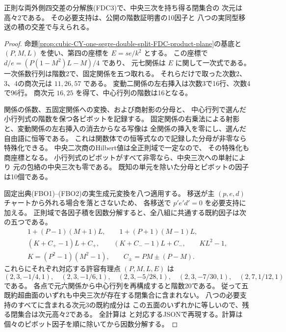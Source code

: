\begin{theorem}\label{thm:cubic-CY-one-segre-double-split-FDC-dimension-two}
正則な両外側四交差の分解族(FDC3)で、中央三次を持ち得る閉集合の
次元は高々2である。
その必要支持は、公開の階数証明書の10因子と
八つの実同型移送の積の交差で与えられる。
\end{theorem}
\begin{proof}
命題\ref{prop:cubic-CY-one-segre-double-split-FDC-product-plane}の基底と
$(P,M,L)$ を使い、第四の座標を $E=se/k^2$ とする。
この座標で $d/e=(P(1-M^2)L-M)/4$ であり、
元七関係は $E$ に関して一次式である。
一次係数行列は階数2で、固定関係を五つ取れる。
それらだけで取った次数2、3、4の商次元は $11,26,57$ である。
変動二関係の左右挿入は次数3で16行、次数4で96行。
商次元 $16,25$ を得て、中心行列の階数は16となる。

関係の係数、五固定関係への変換、および商射影の分母と、
中心行列で選んだ小行列式の階数を保つ各ピボットを記録する。
固定関係の右乗法による射影と、変動関係の左右挿入の消去からなる写像は
全関係の挿入を零にし、選んだ自由語に恒等である。
これは関数体での恒等式なので記録した分母が非零なら特殊化できる。
中央二次商のHilbert値は全正則域で一定なので、
その特殊化も商座標となる。
小行列式のピボットがすべて非零なら、中央三次への単射により
元の包絡の中央三次も零である。
既知の単元を除いた分母とピボットの因子は10個である。

固定出典(FBO1)--(FBO2)の実生成元変換を八つ適用する。
移送が主 $(p,e,d)$ チャートから外れる場合を落とさないため、
各移送で $p'e'd'=0$ を必要支持に加える。
正則域で各因子積を因数分解すると、全八組に共通する既約因子は次の五つである。
\[
\begin{gathered}
 1+(P-1)(M+1)L,\qquad 1+(P+1)(M-1)L,\\
 (K+C_+-1)L+C_+,\qquad (K+C_--1)L+C_-,\qquad K L^2-1,\\
 K=(P^2-1)(M^2-1),\qquad C_\pm=PM\pm(P-M).
\end{gathered}
\]
これらにそれぞれ対応する許容有理点 $(P,M,L,E)$ は
\[
 (2,3,-1/4,1),\quad (2,3,-1/6,1),\quad (2,3,-5/28,1),\quad
 (2,3,-7/30,1),\quad (2,7,1/12,1)
\]
である。
各点で元六関係から中心行列を再構成すると階数20である。
従って五既約超曲面のいずれも中央三次が存在する閉集合に含まれない。
八つの必要支持のすべてに含まれる次元3の既約成分は
この五面のいずれかに等しいので、残る閉集合は次元高々2である。
全計算は 
と対応するJSONで再現する。計算は個々のピボット因子を順に除いてから因数分解する。
\end{proof}

